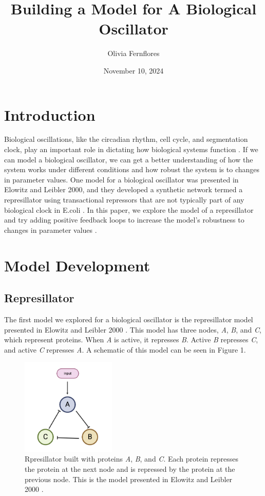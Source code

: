 \documentclass{article}
\title{Building a Model for A Biological Oscillator}
\author{Olivia Fernflores}
\date{November 10, 2024}
\begin{document}
\maketitle

\section{Introduction}

Biological oscillations, like the circadian rhythm, cell cycle, and segmentation clock, play an important role in dictating how biological systems function \cite{oscillationsimportance}. If we can model a biological oscillator, we can get a better understanding of how the system works under different conditions and how robust the system is to changes in parameter values. One model for a biological oscillator was presented in Elowitz and Leibler 2000, and they developed a synthetic network termed a represillator using transactional repressors that are not typically part of any biological clock in E.coli \cite{represillator}. In this paper, we explore the model of a represillator and try adding positive feedback loops to increase the model's robustness to changes in parameter values \cite{represillator}. 

\section{Model Development}

\subsection{Represillator}

The first model we explored for a biological oscillator is the represillator model presented in Elowitz and Leibler 2000 \cite{represillator}. This model has three nodes, \textit{A}, \textit{B}, and \textit{C}, which represent proteins. When \textit{A} is active, it represses \textit{B}. Active \textit{B} represses \textit{C}, and active \textit{C} represses \textit{A}. A schematic of this model can be seen in Figure 1.    

\begin{figure}[H]
    \centering
    \includegraphics[width=0.4\textwidth]{figure1.png}
    \caption{Rpresillator built with proteins \textit{A}, \textit{B}, and \textit{C}. Each protein represses the protein at the next node and is repressed by the protein at the previous node. This is the model presented in Elowitz and Leibler 2000 \cite{represillator}.}
    \label{fig:1}
\end{figure}
\end{document}
